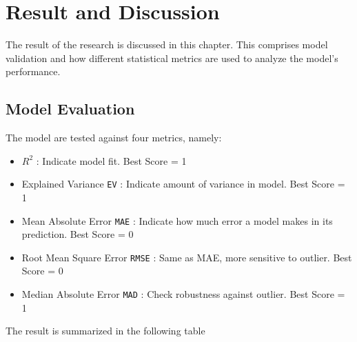 \section{Result and Discussion} \label{result}

The result of the research is discussed in this chapter. 
This comprises model validation and how different statistical metrics are used to analyze the model's performance. 

\subsection{Model Evaluation}

The model are tested against four metrics, namely:

\begin{itemize}
    \item $R^2$ : Indicate model fit. Best Score = 1
    \item Explained Variance \verb|EV| : Indicate amount of variance in model. Best Score = 1
    \item Mean Absolute Error \verb|MAE| : Indicate how much error a model makes in its prediction. Best Score = 0
    \item Root Mean Square Error \verb|RMSE| : Same as MAE, more sensitive to outlier. Best Score = 0
    \item Median Absolute Error \verb|MAD| : Check robustness against outlier. Best Score = 1
\end{itemize}

The result is summarized in the following table

\begin{table}[ht]
    \centering
\caption{Model performance}\label{table1}
\end{table}
 
